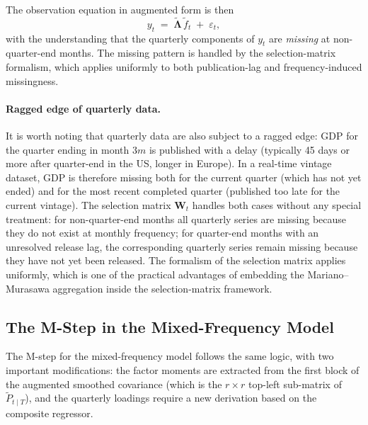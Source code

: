\documentclass[11pt, a4paper, oneside]{article}
\newcommand{\mL}{\boldsymbol{\Lambda}}
\begin{document}
The observation equation in augmented form is then
\[
y_t \;=\; \tilde{\mL}\, \tilde{f}_t \;+\; \varepsilon_t,
\]
with the understanding that the quarterly components of $y_t$ are
\emph{missing} at non-quarter-end months. The missing pattern is
handled by the selection-matrix formalism, which applies uniformly to both
publication-lag and frequency-induced missingness.

\paragraph{Ragged edge of quarterly data.}
It is worth noting that quarterly data are also subject to a ragged
edge: GDP for the quarter ending in month $3m$ is published with a
delay (typically 45 days or more after quarter-end in the US, longer
in Europe). In a real-time vintage dataset, GDP is therefore missing
both for the current quarter (which has not yet ended) and for the
most recent completed quarter (published too late for the current
vintage). The selection matrix $\mathbf{W}_t$ handles both cases
without any special treatment: for non-quarter-end months all
quarterly series are missing because they do not exist at monthly
frequency; for quarter-end months with an unresolved release lag, the
corresponding quarterly series remain missing because they have not
yet been released. The formalism of the selection matrix
applies uniformly, which is one of the practical advantages of
embedding the Mariano–Murasawa aggregation inside the selection-matrix
framework.

\newpage

\subsection{The M-Step in the Mixed-Frequency Model}
\label{subsec:mm-m-step}

The M-step for the mixed-frequency model follows the same logic, with two
important modifications: the factor moments are extracted from the
first block of the augmented smoothed covariance (which is the
$r \times r$ top-left sub-matrix of $\tilde{P}_{t \mid T}$), and the
quarterly loadings require a new derivation based on the composite
regressor.
\end{document}
